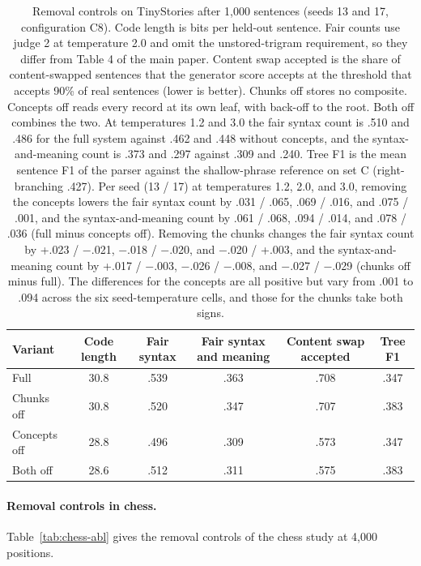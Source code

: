 \documentclass[11pt,letterpaper]{article}
\begin{document}
\begin{table}[h]
\caption{Removal controls on TinyStories after 1,000 sentences (seeds 13 and 17, configuration C8). Code length is bits per held-out sentence. Fair counts use judge 2 at temperature 2.0 and omit the unstored-trigram requirement, so they differ from Table 4 of the main paper.
Content swap accepted is the share of content-swapped sentences that the generator score accepts at the threshold that accepts 90\% of real sentences (lower is better).
Chunks off stores no composite. Concepts off reads every record at its own leaf, with back-off to the root. Both off combines the two. At temperatures 1.2 and 3.0 the fair syntax count is .510 and .486 for the full system against .462 and .448 without concepts, and the syntax-and-meaning count is .373 and .297 against .309 and .240. Tree F1 is the mean sentence F1 of the parser against the shallow-phrase reference on set C (right-branching .427). Per seed (13 / 17) at temperatures 1.2, 2.0, and 3.0, removing the concepts lowers the fair syntax count by .031 / .065, .069 / .016, and .075 / .001, and the syntax-and-meaning count by .061 / .068, .094 / .014, and .078 / .036 (full minus concepts off). Removing the chunks changes the fair syntax count by +.023 / $-$.021, $-$.018 / $-$.020, and $-$.020 / +.003, and the syntax-and-meaning count by +.017 / $-$.003, $-$.026 / $-$.008, and $-$.027 / $-$.029 (chunks off minus full). The differences for the concepts are all positive but vary from .001 to .094 across the six seed-temperature cells, and those for the chunks take both signs.}
\label{tab:ablation}
\begin{center}
\small
\begin{tabular}{lccccc}
\toprule
Variant & Code length & Fair syntax & Fair syntax and meaning & Content swap accepted & Tree F1 \\
\midrule
Full & 30.8 & .539 & .363 & .708 & .347 \\
Chunks off & 30.8 & .520 & .347 & .707 & .383 \\
Concepts off & 28.8 & .496 & .309 & .573 & .347 \\
Both off & 28.6 & .512 & .311 & .575 & .383 \\
\bottomrule
\end{tabular}
\end{center}
\end{table}


\paragraph{Removal controls in chess.} Table~\ref{tab:chess-abl} gives the removal controls of the chess study at 4,000 positions.
\end{document}
